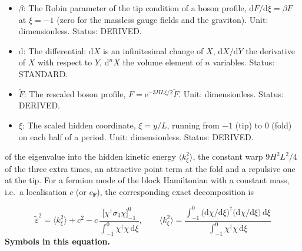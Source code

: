 \documentclass[
  10pt,
]{article}
\begin{document}
\begin{itemize}
  \(\varrho_\xi = \chi^\dagger\chi/\int_{-1}^{0}\chi^\dagger\chi\,\mathrm{d}\xi\)
  for a fermion. \(\varrho_\xi(0)\) is its value at the fold,
  \(\varrho_\xi(-1)\) its value at the tip; over the full period the
  density is symmetric about the fold. Unit: dimensionless. Status:
  DERIVED.
\item
  \(\beta\): The Robin parameter of the tip condition of a boson
  profile, \(\mathrm{d}F/\mathrm{d}\xi = \beta F\) at \(\xi = -1\) (zero
  for the massless gauge fields and the graviton). Unit: dimensionless.
  Status: DERIVED.
\item
  \(\mathrm{d}\): The differential: \(\mathrm{d}X\) is an infinitesimal
  change of \(X\), \(\mathrm{d}X/\mathrm{d}Y\) the derivative of \(X\)
  with respect to \(Y\), \(\mathrm{d}^nX\) the volume element of \(n\)
  variables. Status: STANDARD.
\item
  \(\tilde F\): The rescaled boson profile,
  \(F = \mathrm{e}^{-3HL\xi/2}\tilde F\). Unit: dimensionless. Status:
  DERIVED.
\item
  \(\xi\): The scaled hidden coordinate, \(\xi = y/L\), running from
  \(-1\) (tip) to \(0\) (fold) on each half of a period. Unit:
  dimensionless. Status: DERIVED.
\end{itemize}

of the eigenvalue into the hidden kinetic energy
\(\langle k_\xi^2\rangle\), the constant warp \(9H^2L^2/4\) of the three
extra times, an attractive point term at the fold and a repulsive one at
the tip. For a fermion mode of the block Hamiltonian with a constant
mass, i.e.~a localisation \(c\) (or \(c_\Psi\)), the corresponding exact
decomposition is

\[ \tilde\varepsilon^2 = \langle k_\xi^2\rangle + c^2 - c\,\frac{\big[\chi^\dagger\sigma_3\chi\big]_{-1}^{0}}{\int_{-1}^{0}\chi^\dagger\chi\,\mathrm{d}\xi},\qquad \langle k_\xi^2\rangle = \frac{\int_{-1}^{0}\big(\mathrm{d}\chi/\mathrm{d}\xi\big)^\dagger\big(\mathrm{d}\chi/\mathrm{d}\xi\big)\,\mathrm{d}\xi}{\int_{-1}^{0}\chi^\dagger\chi\,\mathrm{d}\xi} \]
\textbf{Symbols in this equation.}
\end{document}
